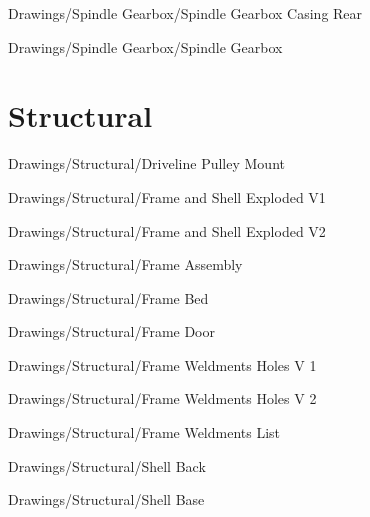 
{Drawings/Spindle Gearbox/Spindle Gearbox Casing Rear}


{Drawings/Spindle Gearbox/Spindle Gearbox}

\section{Structural}


{Drawings/Structural/Driveline Pulley Mount}


{Drawings/Structural/Frame and Shell Exploded V1}


{Drawings/Structural/Frame and Shell Exploded V2}


{Drawings/Structural/Frame Assembly}


{Drawings/Structural/Frame Bed}


{Drawings/Structural/Frame Door}


{Drawings/Structural/Frame Weldments Holes V 1}


{Drawings/Structural/Frame Weldments Holes V 2}


{Drawings/Structural/Frame Weldments List}


{Drawings/Structural/Shell Back}


{Drawings/Structural/Shell Base}

